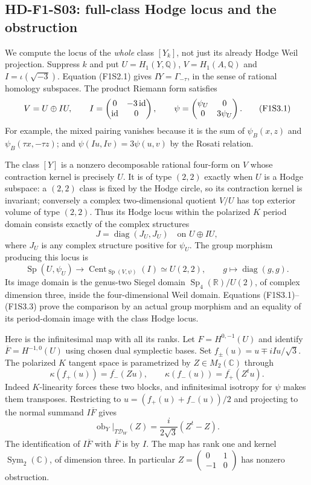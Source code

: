 \subsection{HD-F1-S03: full-class Hodge locus and the obstruction}

We compute the locus of the \emph{whole} class $[Y_k]$, not just its
already Hodge Weil projection. Suppress $k$ and put
$U=H_1(Y,\mathbb Q)$, $V=H_1(A,\mathbb Q)$ and
$I=\iota(\sqrt{-3})$. Equation (F1S2.1) gives
$IY=\Gamma_{-\tau}$, in the sense of rational homology subspaces.
The product Riemann form satisfies
\[
 V=U\oplus IU,\qquad
 I=\begin{pmatrix}0&-3\,\mathrm{id}\cr\mathrm{id}&0\end{pmatrix},
 \qquad \psi=\begin{pmatrix}\psi_U&0\cr0&3\psi_U\end{pmatrix}.
 \tag{F1S3.1}
\]
For example, the mixed pairing vanishes because it is the sum of
$\psi_B(x,z)$ and $\psi_B(\tau x,-\tau z)$; and
$\psi(Iu,Iv)=3\psi(u,v)$ by the Rosati relation.

The class $[Y]$ is a nonzero decomposable rational four-form on
$V$ whose contraction kernel is precisely $U$. It is of type
$(2,2)$ exactly when $U$ is a Hodge subspace: a $(2,2)$ class is
fixed by the Hodge circle, so its contraction kernel is invariant;
conversely a complex two-dimensional quotient $V/U$ has top
exterior volume of type $(2,2)$. Thus its Hodge locus within the
polarized $K$ period domain consists exactly of the complex
structures
\[
 J=\operatorname{diag}(J_U,J_U)
 \quad\text{on }U\oplus IU,
 \tag{F1S3.2}
\]
where $J_U$ is any complex structure positive for $\psi_U$.
The group morphism producing this locus is
\[
 \operatorname{Sp}(U,\psi_U)\longrightarrow
 \operatorname{Cent}_{\operatorname{Sp}(V,\psi)}(I)
       \simeq U(2,2),\qquad g\longmapsto\operatorname{diag}(g,g).
 \tag{F1S3.3}
\]
Its image domain is the genus-two Siegel domain
$\operatorname{Sp}_4(\mathbb R)/U(2)$, of complex dimension three,
inside the four-dimensional Weil domain. Equations (F1S3.1)--(F1S3.3)
prove the comparison by an actual group morphism and an equality
of its period-domain image with the class Hodge locus.

Here is the infinitesimal map with all its ranks. Let
$F=H^{0,-1}(U)$ and identify $\overline F=H^{-1,0}(U)$ using
chosen dual symplectic bases. Set
$f_\pm(u)=u\mp i Iu/\sqrt3$. The polarized $K$ tangent space
is parametrized by $Z\in M_2(\mathbb C)$ through
\[
 \kappa(f_+(u))=\overline{f_-}(Zu),\qquad
 \kappa(f_-(u))=\overline{f_+}(Z^tu).
 \tag{F1S3.4}
\]
Indeed $K$-linearity forces these two blocks, and infinitesimal
isotropy for $\psi$ makes them transposes. Restricting to
$u=(f_+(u)+f_-(u))/2$ and projecting to the normal summand
$I\overline F$ gives
\[
 \operatorname{ob}_Y|_{T\mathcal D_W}(Z)
       =\frac{i}{2\sqrt3}(Z^t-Z).
 \tag{F1S3.5}
\]
The identification of $I\overline F$ with $\overline F$ is by $I$.
The map has rank one and kernel $\operatorname{Sym}_2(\mathbb C)$,
of dimension three. In particular $Z=\left(\begin{smallmatrix}
0&1\\-1&0\end{smallmatrix}\right)$ has nonzero obstruction.


